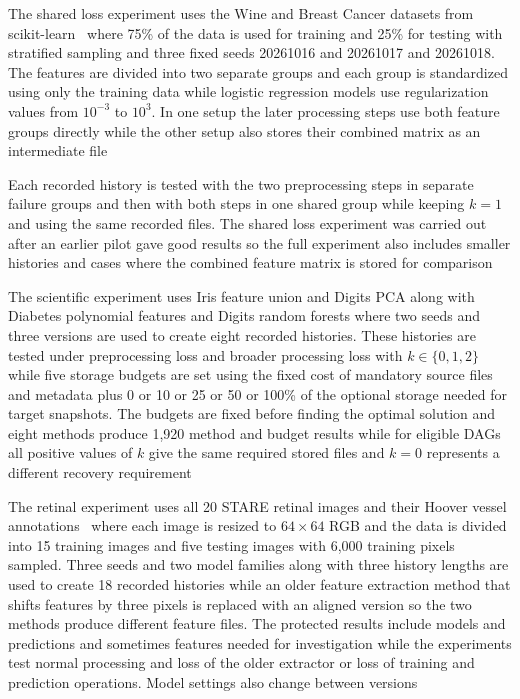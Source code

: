 The shared loss experiment uses the Wine and Breast Cancer datasets from scikit-learn~\cite{datasets} where 75\% of the data is used for training and 25\% for testing with stratified sampling and three fixed seeds 20261016 and 20261017 and 20261018. The features are divided into two separate groups and each group is standardized using only the training data while logistic regression models use regularization values from $10^{-3}$ to $10^3$. In one setup the later processing steps use both feature groups directly while the other setup also stores their combined matrix as an intermediate file

Each recorded history is tested with the two preprocessing steps in separate failure groups and then with both steps in one shared group while keeping $k=1$ and using the same recorded files. The shared loss experiment was carried out after an earlier pilot gave good results so the full experiment also includes smaller histories and cases where the combined feature matrix is stored for comparison

The scientific experiment uses Iris feature union and Digits PCA along with Diabetes polynomial features and Digits random forests where two seeds and three versions are used to create eight recorded histories. These histories are tested under preprocessing loss and broader processing loss with $k\in\{0,1,2\}$ while five storage budgets are set using the fixed cost of mandatory source files and metadata plus 0 or 10 or 25 or 50 or 100\% of the optional storage needed for target snapshots. The budgets are fixed before finding the optimal solution and eight methods produce 1,920 method and budget results while for eligible DAGs all positive values of $k$ give the same required stored files and $k=0$ represents a different recovery requirement

The retinal experiment uses all 20 STARE retinal images and their Hoover vessel annotations~\cite{stare} where each image is resized to $64\times64$ RGB and the data is divided into 15 training images and five testing images with 6,000 training pixels sampled. Three seeds and two model families along with three history lengths are used to create 18 recorded histories while an older feature extraction method that shifts features by three pixels is replaced with an aligned version so the two methods produce different feature files. The protected results include models and predictions and sometimes features needed for investigation while the experiments test normal processing and loss of the older extractor or loss of training and prediction operations. Model settings also change between versions

